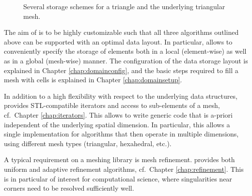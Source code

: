 \begin{figure}[bt]
{ }
 \caption{Several storage schemes for a triangle and the underlying triangular mesh.}
 \label{fig:storage-schemes-triangle}
\end{figure}

The aim of {\ViennaGrid} is to be highly customizable such that all three algorithms outlined above can be supported with an optimal data layout. In particular, {\ViennaGrid} allows to conveniently specify the storage of elements both in a local (element-wise) as well as in a global (mesh-wise) manner. The configuration of the data storage layout is explained in Chapter \ref{chap:domainconfig}, and the basic steps required to fill a mesh with cells is explained in Chapter \ref{chap:domainsetup}.

In addition to a high flexibility with respect to the underlying data structures, {\ViennaGrid} provides STL-compatible iterators and access to sub-elements of a mesh, cf.~Chapter \ref{chap:iterators}. This allows to write generic code that is a-priori independent of the underlying spatial dimension. In particular, this allows a single implementation for algorithms that then operate in multiple dimensions, using different mesh types (triangular, hexahedral, etc.).

A typical requirement on a meshing library is mesh refinement. {\ViennaGrid} provides both uniform and adaptive refinement algorithms, cf.~Chapter \ref{chap:refinement}. This is in particular of interest for computational science, where singularities near corners need to be resolved sufficiently well.


